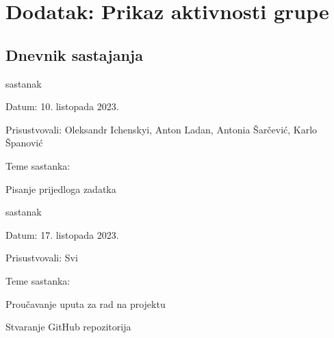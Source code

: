 \chapter*{Dodatak: Prikaz aktivnosti grupe}

\section*{Dnevnik sastajanja}



\begin{packed_enum}

\item sastanak

\item[] \begin{packed_item}

	\item Datum: 10. listopada 2023.
	\item Prisustvovali: Oleksandr Ichenskyi, Anton Ladan, Antonia Šarčević, Karlo Španović
	\item Teme sastanka:
		\begin{packed_item}

			\item Pisanje prijedloga zadatka

		\end{packed_item}

\end{packed_item}

\item sastanak

\item[] \begin{packed_item}

	\item Datum: 17. listopada 2023.
	\item Prisustvovali: Svi
	\item Teme sastanka:
		\begin{packed_item}

			\item Proučavanje uputa za rad na projektu
			\item Stvaranje GitHub repozitorija

		\end{packed_item}


\end{packed_item}
\end{packed_enum}
